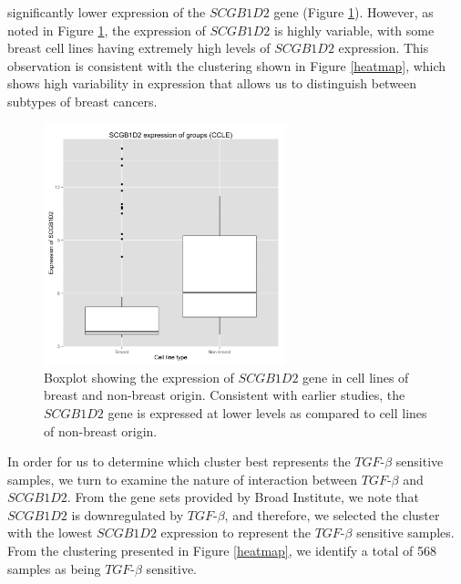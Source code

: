\documentclass[a4paper,12pt]{article}
\begin{document}
significantly lower expression of the $\textit{SCGB1D2}$ gene (Figure
\ref{scgb1d2ref}). However, as noted in Figure \ref{scgb1d2ref}, the
expression of $\textit{SCGB1D2}$ is highly variable, with some breast
cell lines having extremely high levels of $\textit{SCGB1D2}$
expression. This observation is consistent with the clustering shown
in Figure \ref{heatmap}, which shows high variability in expression
that allows us to distinguish between subtypes of breast cancers.
\begin{figure}[htbp!]
\centering
\includegraphics[width=7cm]{scgb1d2expression.png}
\caption[Boxplots of $\textit{SCGB1D2}$ between cell lines of breast
and non-breast origins]{Boxplot showing the expression of
  $\textit{SCGB1D2}$ gene in cell lines of breast and non-breast
  origin. Consistent with earlier studies, the $\textit{SCGB1D2}$ gene
is expressed at lower levels as compared to cell lines of non-breast origin.}
\label{scgb1d2ref}
\end{figure}
In order for us to determine which cluster best represents the
$\textit{TGF}$-$\beta$ sensitive samples, we turn to examine the
nature of interaction between $\textit{TGF}$-$\beta$ and
$\textit{SCGB1D2}$. From the gene sets provided by Broad Institute, we
note that $\textit{SCGB1D2}$ is downregulated by
$\textit{TGF}$-$\beta$, and therefore, we selected the cluster with
the lowest $\textit{SCGB1D2}$ expression to represent the  $\textit{TGF}$-$\beta$
sensitive samples. From the clustering presented in Figure
\ref{heatmap}, we identify a total of 568 samples as being
$\textit{TGF}$-$\beta$ sensitive.
\end{document}
